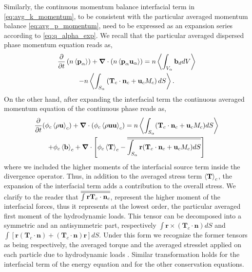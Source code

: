 Similarly, the continuous momentum balance interfacial term in \ref{eq:avg_k_momentum}, to be consistent with the particular averaged momentum balance \ref{eq:avg_p_momentum}, need to be expressed as an expansion series according to \ref{eq:q_alpha_exp}.  
We recall that the particular averaged dispersed phase momentum equation reads as,
\begin{multline}
    \frac{\partial}{\partial t}   \left(n \left<\textbf{p}_\alpha\right>\right)
    + \bm{\nabla} \cdot (n \left<\textbf{p}_\alpha \textbf{u}_\alpha\right>)
    = n \left<\int_{V_\alpha} \textbf{b}_d dV\right>\\
    - n \left<\int_{S_\alpha} \left(\textbf{T}_c  \cdot \textbf{n}_c  + \textbf{u}_c M_c \right) d S\right>.
    \label{eq:classic_hybrid_momentum_p}
\end{multline}
On the other hand, after expanding the interfacial term the continuous averaged momentum equation of the continuous phase reads as, 
\begin{multline}
    \frac{\partial}{\partial t} (\phi_c\left<\rho\textbf{u}\right>_c) 
    + \bm{\nabla} \cdot ( \phi_c \left<\rho\textbf{uu}\right>_c)
    = n \left<\int_{S_\alpha} (\textbf{T}_c  \cdot \textbf{n}_c + \textbf{u}_c M_c) d S\right>\\
    +\phi_c\left<\textbf{b}\right>_c
    + \bm{\nabla}\cdot\left[
    \phi_c \left<\textbf{T}\right>_c
    - \overline{\overline{\int_{S_\alpha} \textbf{r} (\textbf{T}_c  \cdot \textbf{n}_c + \textbf{u}_c M_c)dS}}
    \right]
    \label{eq:classic_hybrid_momentum_c}
\end{multline}
where we included the higher moments of the interfacial source term inside the divergence operator. 
Thus, in addition to the averaged stress term $\left<\textbf{T}\right>_c$, the expansion of the interfacial term adds a contribution to the overall stress.
We clarify to the reader that $\overline{\overline{\int \textbf{r}\textbf{T}_c  \cdot \textbf{n}_c}}$, represent the higher moment of the interfacial forces, thus it represents at the lowest order, the particular averaged first moment of the hydrodynamic loads.
This tensor can be decomposed into a symmetric and an antisymmetric part, respectively $\int \textbf{r} \times (\textbf{T}_c\cdot\textbf{n}) dS$ and $\int \left[\textbf{r} (\textbf{T}_c\cdot\textbf{n}) +(\textbf{T}_c\cdot\textbf{n}) \textbf{r} \right]  dS$. 
Under this form we recognize the former tensors as being respectively, the averaged torque  and the averaged stresslet applied on each particle due to hydrodynamic loads \citep{kim2013microhydrodynamics}. 
Similar transformation holds for the interfacial term of the energy equation and for the other conservation equations. 

